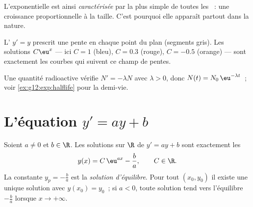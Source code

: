 \begin{remark}
L'exponentielle est ainsi \emph{caractérisée} par la plus simple de toutes
les ~: une croissance proportionnelle à la taille.
C'est pourquoi elle apparaît partout dans la nature.
\end{remark}

\begin{omfigure}

{\small L' $y' = y$ prescrit une pente en chaque point du plan
(segments gris). Les solutions $C\eu^{x}$ --- ici $C = 1$ (bleu),
$C = 0.3$ (rouge), $C = -0.5$ (orange) --- sont exactement les courbes qui
suivent ce champ de pentes.}
\end{omfigure}

\begin{example}\label{ex:g12:diffeq:decay}
Une quantité radioactive vérifie $N' = -\lambda N$ avec $\lambda > 0$, donc
$N(t) = N_0\,\eu^{-\lambda t}$~; voir \cref{ex:g12:exp:halflife} pour la
demi-vie.
\end{example}

\section{L'équation \texorpdfstring{$y' = ay + b$}{y' = ay + b}}

\begin{theorem}[Solutions de $y' = ay + b$]\label{thm:g12:diffeq:affine}
Soient $a \neq 0$ et $b \in \R$. Les solutions sur $\R$ de $y' = ay + b$
sont exactement les 
\[
y(x) = C\,\eu^{ax} - \frac{b}{a}, \qquad C \in \R .
\]
La  constante $y_p = -\frac ba$ est la \emph{solution
d'équilibre}. Pour tout $(x_0, y_0)$ il existe une unique solution avec
$y(x_0) = y_0$~; si $a < 0$, toute solution tend vers l'équilibre
$-\frac ba$ lorsque $x \to +\infty$.
\end{theorem}

